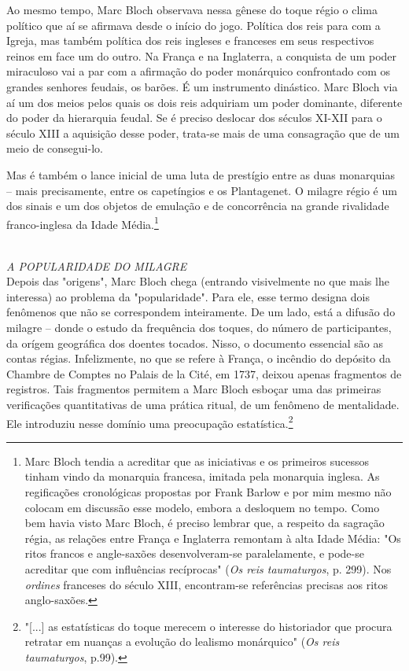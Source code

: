 \documentclass[a5paper]{book}
\begin{document}
Ao mesmo tempo, Marc Bloch observava nessa gênese do toque régio o clima político que aí se afirmava desde o início do jogo. Política dos reis para com a Igreja, mas também política dos reis ingleses e franceses em seus respectivos reinos em face um do outro. Na França e na Inglaterra, a conquista de um poder miraculoso vai a par com a afirmação do poder monárquico confrontado com os grandes senhores feudais, os barões. É um instrumento dinástico. Marc Bloch via aí um dos meios pelos quais os dois reis adquiriam um poder dominante, diferente do poder da hierarquia feudal. Se é preciso deslocar dos séculos XI-XII para o século XIII a aquisição desse poder, trata-se mais de uma consagração que de um meio de consegui-lo.

Mas é também o lance inicial de uma luta de prestígio entre as duas monarquias -- mais precisamente, entre os capetíngios e os Plantagenet. O milagre régio é um dos sinais e um dos objetos de emulação e de concorrência na grande rivalidade franco-inglesa da Idade Média.\footnote{Marc Bloch tendia a acreditar que as iniciativas e os primeiros sucessos tinham vindo da monarquia francesa, imitada pela monarquia inglesa. As regificações cronológicas propostas por Frank Barlow e por mim mesmo não colocam em discussão esse modelo, embora a desloquem no tempo. Como bem havia visto Marc Bloch, é preciso lembrar que, a respeito da sagração régia, as relações entre França e Inglaterra remontam à alta Idade Média: "Os ritos francos e angle-saxões desenvolveram-se paralelamente, e pode-se acreditar que com influências recíprocas" (\textit{Os reis taumaturgos}, p. 299). Nos \textit{ordines} franceses do século XIII, encontram-se referências precisas aos ritos anglo-saxões.}

~\\ \large \textit{A POPULARIDADE DO MILAGRE} ~\\

Depois das "origens", Marc Bloch chega (entrando visivelmente no que mais lhe interessa) ao problema da "popularidade". Para ele, esse termo designa dois fenômenos que não se correspondem inteiramente. De um lado, está a difusão do milagre -- donde o estudo da frequência dos toques, do número de participantes, da orígem geográfica dos doentes tocados. Nisso, o documento essencial são as contas régias. Infelizmente, no que se refere à França, o incêndio do depósito da Chambre de Comptes no Palais de la Cité, em  1737, deixou apenas fragmentos de registros. Tais fragmentos permitem a Marc Bloch esboçar uma das primeiras verificações quantitativas de uma prática ritual, de um fenômeno de mentalidade. Ele introduziu nesse domínio uma preocupação estatística.\footnote{"[...] as estatísticas do toque merecem o interesse do historiador que procura retratar em nuanças a evolução do lealismo monárquico" (\textit{Os reis taumaturgos}, p.99).}
\end{document}
